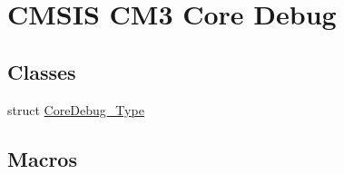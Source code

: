 \hypertarget{group___c_m_s_i_s___c_m3___core_debug}{}\section{C\+M\+S\+IS C\+M3 Core Debug}
\label{group___c_m_s_i_s___c_m3___core_debug}
\subsection*{Classes}
\begin{DoxyCompactItemize}
\item 
struct \hyperlink{struct_core_debug___type}{Core\+Debug\+\_\+\+Type}
\end{DoxyCompactItemize}
\subsection*{Macros}
